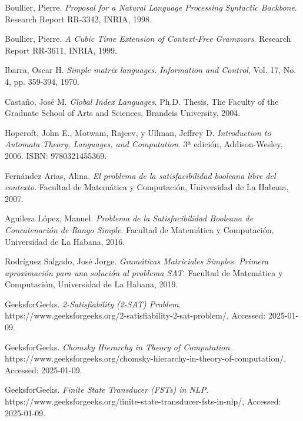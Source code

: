 \documentclass[12pt]{article}
\begin{document}
\begin{thebibliography}{99}
      
      Boullier, Pierre. 
      \textit{Proposal for a Natural Language Processing Syntactic Backbone}. 
      Research Report RR-3342, INRIA, 1998. 
      
      Boullier, Pierre. 
      \textit{A Cubic Time Extension of Context-Free Grammars}. 
      Research Report RR-3611, INRIA, 1999. 
      
      Ibarra, Oscar H. 
      \textit{Simple matrix languages}. 
      \textit{Information and Control}, Vol. 17, No. 4, pp. 359-394, 1970. 
      
      Castaño, José M. 
      \textit{Global Index Languages}. 
      Ph.D. Thesis, The Faculty of the Graduate School of Arts and Sciences, Brandeis University, 2004.
      
      Hopcroft, John E., Motwani, Rajeev, y Ullman, Jeffrey D. 
      \textit{Introduction to Automata Theory, Languages, and Computation}. 
      3ª edición, Addison-Wesley, 2006. ISBN: 9780321455369.
      
      Fernández Arias, Alina. 
      \textit{El problema de la satisfacibilidad booleana libre del contexto}. 
      Facultad de Matemática y Computación, Universidad de La Habana, 2007.
      
      Aguilera López, Manuel. 
      \textit{Problema de la Satisfacibilidad Booleana de Concatenación de Rango Simple}. 
      Facultad de Matemática y Computación, Universidad de La Habana, 2016.
      
      Rodríguez Salgado, José Jorge. 
      \textit{Gramáticas Matriciales Simples. Primera aproximación para una solución al problema SAT}. 
      Facultad de Matemática y Computación, Universidad de La Habana, 2019.
      
      GeeksforGeeks. 
      \textit{2-Satisfiability (2-SAT) Problem}. 
      https://www.geeksforgeeks.org/2-satisfiability-2-sat-problem/, Accessed: 2025-01-09.
      
      GeeksforGeeks. 
      \textit{Chomsky Hierarchy in Theory of Computation}. 
      https://www.geeksforgeeks.org/chomsky-hierarchy-in-theory-of-computation/, Accessed: 2025-01-09.
      
      GeeksforGeeks. 
      \textit{Finite State Transducer (FSTs) in NLP}. 
      https://www.geeksforgeeks.org/finite-state-transducer-fsts-in-nlp/, Accessed: 2025-01-09.
      
      
      
\end{thebibliography}
\end{document}
